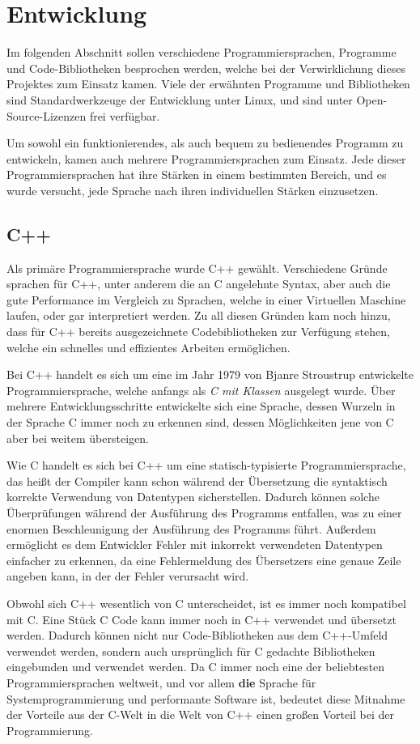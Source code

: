 \chapter{Entwicklung}
Im folgenden Abschnitt sollen verschiedene Programmiersprachen, Programme und Code-Bib\-lio\-theken besprochen werden, welche bei der Verwirklichung dieses Projektes zum Einsatz kamen. 
Viele der erwähnten Programme und Bibliotheken sind Standardwerkzeuge der Entwicklung unter Linux, und sind unter Open-Source-Lizenzen frei verfügbar. 

Um sowohl ein funktionierendes, als auch bequem zu bedienendes Programm zu entwickeln, kamen auch mehrere Programmiersprachen zum Einsatz. Jede dieser Programmiersprachen hat ihre Stärken in 
einem bestimmten Bereich, und es wurde versucht, jede Sprache nach ihren individuellen Stärken einzusetzen. 

\section{C++}
\label{sec:cpp}
Als primäre Programmiersprache wurde C++ gewählt. Verschiedene Gründe sprachen für C++, unter anderem die an C angelehnte Syntax, aber
auch die gute Performance im Vergleich zu Sprachen, welche in einer Virtuellen Maschine laufen, oder gar interpretiert werden. Zu 
all diesen Gründen kam noch hinzu, dass für C++ bereits ausgezeichnete Codebibliotheken zur Verfügung stehen, welche ein schnelles
und effizientes Arbeiten ermöglichen.

Bei C++ handelt es sich um eine im Jahr 1979 von Bjanre Stroustrup entwickelte Programmiersprache, welche anfangs als \textit{C mit Klassen}
ausgelegt wurde. Über mehrere Entwicklungsschritte entwickelte sich eine Sprache, dessen Wurzeln in der Sprache C immer noch zu erkennen sind, 
dessen Möglichkeiten jene von C aber bei weitem übersteigen. 

Wie C handelt es sich bei C++ um eine statisch-typisierte Programmiersprache, das heißt der Compiler kann schon während der Übersetzung die
syntaktisch korrekte Verwendung von Datentypen sicherstellen. Dadurch können solche Überprüfungen während der Ausführung des Programms
entfallen, was zu einer enormen Beschleunigung der Ausführung des Programms führt. Außerdem ermöglicht es dem Entwickler Fehler mit
inkorrekt verwendeten Datentypen einfacher zu erkennen, da eine Fehlermeldung des Übersetzers eine genaue Zeile angeben kann, in der 
der Fehler verursacht wird. 

Obwohl sich C++ wesentlich von C unterscheidet, ist es immer noch kompatibel mit C. Eine Stück C Code kann immer noch in C++ verwendet und
übersetzt werden. Dadurch können nicht nur Code-Bibliotheken aus dem C++-Umfeld verwendet werden, sondern auch ursprünglich für C gedachte
Bibliotheken eingebunden und verwendet werden. Da C immer noch eine der beliebtesten Programmiersprachen weltweit, und vor allem \textbf{die}
Sprache für Systemprogrammierung und performante Software ist, bedeutet diese Mitnahme der Vorteile aus der C-Welt in die Welt von C++
einen großen Vorteil bei der Programmierung.

